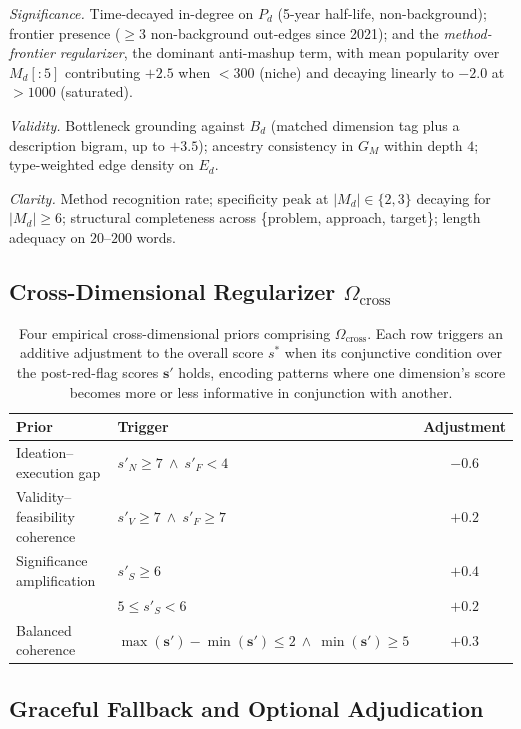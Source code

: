\documentclass{opendatalab}
\begin{document}
\emph{Significance.} Time-decayed in-degree on $P_d$ (5-year half-life, non-background); frontier presence
($\ge 3$ non-background out-edges since 2021); and the \emph{method-frontier regularizer}, the dominant
anti-mashup term, with mean popularity over $M_d[:5]$ contributing $+2.5$ when $<300$ (niche) and decaying
linearly to $-2.0$ at $>1000$ (saturated).

\emph{Validity.} Bottleneck grounding against $B_d$ (matched dimension tag plus a description bigram, up to $+3.5$); ancestry consistency in $G_M$ within depth $4$; type-weighted edge density on $E_d$.

\emph{Clarity.} Method recognition rate; specificity peak at $|M_d|\in\{2,3\}$ decaying for $|M_d|\ge 6$; structural completeness across \{problem, approach, target\}; length adequacy on $20$--$200$ words.

\subsection{Cross-Dimensional Regularizer $\Omega_{\text{cross}}$}
\label{app:cross-dim}

\begin{table}[h]
\centering
\caption{Four empirical cross-dimensional priors comprising $\Omega_{\text{cross}}$. Each row triggers an additive
adjustment to the overall score $s^\ast$ when its conjunctive condition over the post-red-flag scores
$\mathbf{s}'$ holds, encoding patterns where one dimension's score becomes more or less informative in
conjunction with another.}
\label{tab:cross-dim}
\begin{tabularx}{\linewidth}{l X c}
\toprule
Prior & Trigger & Adjustment \\
\midrule
Ideation--execution gap & $s'_N\ge 7\ \land\ s'_F<4$ & $-0.6$ \\
Validity--feasibility coherence & $s'_V\ge 7\ \land\ s'_F\ge 7$ & $+0.2$ \\
Significance amplification & $s'_S\ge 6$ & $+0.4$ \\
& $5\le s'_S<6$ & $+0.2$ \\
Balanced coherence & $\max(\mathbf{s}')-\min(\mathbf{s}')\le 2\ \land\ \min(\mathbf{s}')\ge 5$ & $+0.3$ \\
\bottomrule
\end{tabularx}
\end{table}


\subsection{Graceful Fallback and Optional Adjudication}
\label{app:adjudication}
\end{document}

